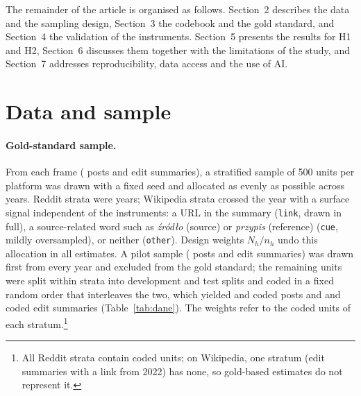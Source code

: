 \documentclass[10pt,a4paper]{article}
\newcommand{\kod}[1]{\texttt{#1}}
\newcommand{\punkty}[2]{\par\noindent\fbox{\parbox{\dimexpr\linewidth-2\fboxsep}{\small\textbf{Do napisania własnymi słowami (#1).} Punkty i liczby:\begin{itemize}\setlength\itemsep{0pt}#2\end{itemize}}}\par}
\begin{document}
The remainder of the article is organised as follows. Section~2 describes the data and
the sampling design, Section~3 the codebook and the gold standard, and Section~4 the
validation of the instruments. Section~5 presents the results for H1 and H2, Section~6
discusses them together with the limitations of the study, and Section~7 addresses
reproducibility, data access and the use of AI.

\section{Data and sample}
\paragraph{Gold-standard sample.}
From each frame (\resRedditFrame{} posts and \resWikipediaFrame{} edit summaries), a
stratified sample of 500 units per platform was drawn with a fixed seed and allocated as
evenly as possible across years. Reddit strata were years; Wikipedia strata crossed the
year with a surface signal independent of the instruments: a URL in the summary
(\kod{link}, drawn in full), a source-related word such as \emph{źródło} (source) or
\emph{przypis} (reference) (\kod{cue}, mildly oversampled), or neither (\kod{other}).
Design weights $N_h/n_h$ undo this allocation in all estimates. A pilot sample
(\resRedditPilot{} posts and \resWikipediaPilot{} edit summaries) was drawn first from every
year and excluded from the gold standard; the remaining units were split within strata
into development and test splits and coded in a fixed random order that interleaves the
two, which yielded \resRedditCodedDev{} and \resRedditCodedTest{} coded posts and
\resWikipediaCodedDev{} and \resWikipediaCodedTest{} coded edit summaries
(Table~\ref{tab:dane}). The weights refer to the coded units of each
stratum.\footnote{All Reddit strata contain coded units; on Wikipedia, one stratum (edit
summaries with a link from 2022) has none, so gold-based estimates do not represent it.}
\end{document}
